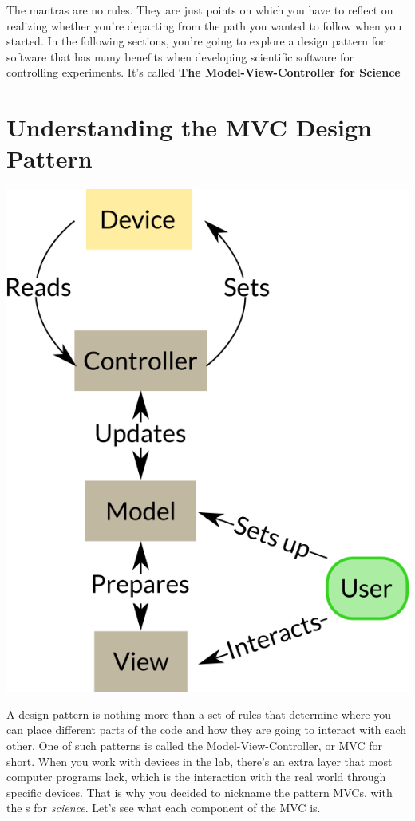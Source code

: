 The mantras are no rules. They are just points on which you have to reflect on realizing whether you're departing from the path you wanted to follow when you started. In the following sections, you're going to explore a design pattern for software that has many benefits when developing scientific software for controlling experiments. It's called \textbf{The Model-View-Controller for Science}

\section{Understanding the MVC Design Pattern}\label{sec:mvc}
\begin{center}
\includegraphics{images/Chapter_04/MVCs.png}
\end{center}

A design pattern is nothing more than a set of rules that determine where you can place different parts of the code and how they are going to interact with each other. One of such patterns is called the Model-View-Controller, or MVC for short. When you work with devices in the lab, there's an extra layer that most computer programs lack, which is the interaction with the real world through specific devices. That is why you decided to nickname the pattern MVCs, with the s for \emph{science}. Let's see what each component of the MVC is.

